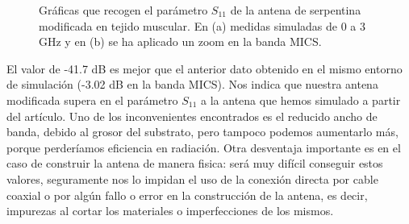 \begin{figure}[!htb]
    \centering
    \caption{Gráficas que recogen el parámetro $S_{11}$ de la antena de serpentina modificada en tejido muscular. En (a) medidas simuladas de 0 a 3 GHz y en (b) se ha aplicado un zoom en la banda MICS.}
    \label{fig:fig5.23}
\end{figure}

El valor de -41.7 dB es mejor que el anterior dato obtenido en el mismo entorno de simulación (-3.02 dB en la banda MICS). Nos indica que nuestra antena modificada supera en el parámetro $S_{11}$ a la antena que hemos simulado a partir del artículo. Uno de los inconvenientes encontrados es el reducido ancho de banda, debido al grosor del substrato, pero tampoco podemos aumentarlo más, porque perderíamos eficiencia en radiación. Otra desventaja importante es en el caso de construir la antena de manera fisica: será muy difícil conseguir estos valores, seguramente nos lo impidan el uso de la conexión directa por cable coaxial o por algún fallo o error en la construcción de la antena, es decir, impurezas al cortar los materiales o imperfecciones de los mismos.

